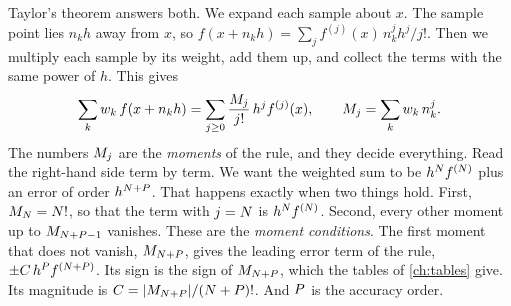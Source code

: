 Taylor's theorem answers both. We expand each sample about $x$. The sample point lies $n_k h$ away from $x$, so
$f(x + n_k h) = \sum_j f^{(j)}(x)\, n_k^j h^j / j!$. Then we multiply each sample by its weight, add them up, and
collect the terms with the same power of $h$. This gives
\begin{equation}
  \sum_k w_k\, f(x + n_k h) = \sum_{j \ge 0} \frac{M_{j}}{j!}\, h^j f^{(j)}(x),
  \qquad M_{j} = \sum_k w_k\, n_k^j .
  \label{eq:stencils-moments}
\end{equation}
The numbers $M_{j}$ are the \emph{moments} of the rule, and they decide everything. Read the right-hand side term
by term. We want the weighted sum to be $h^{N} f^{(N)}$ plus an error of order $h^{N + P}$.
That happens exactly when two things hold. First, $M_{N} = N!$, so that the term with $j = N$ is
$h^{N} f^{(N)}$. Second, every other moment up to $M_{N + P - 1}$ vanishes. These are the
\emph{moment conditions}. The first moment that does not vanish, $M_{N + P}$, gives the leading error
term of the rule, $\pm C\, h^{P} f^{(N + P)}$. Its sign is the sign of
$M_{N + P}$, which the tables of \cref{ch:tables} give. Its magnitude is
$C = \lvert M_{N + P} \rvert / (N + P)!$. And $P$ is the accuracy order.

